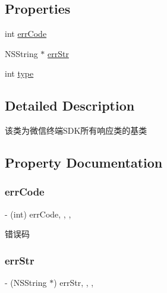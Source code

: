 \subsection*{Properties}
\begin{DoxyCompactItemize}
\item 
int \mbox{\hyperlink{interface_base_resp_ab21bc865cec3fc92ce2f911dc60ede04}{err\+Code}}
\item 
N\+S\+String $\ast$ \mbox{\hyperlink{interface_base_resp_a7d3f994261a01b950055083c56c52dec}{err\+Str}}
\item 
int \mbox{\hyperlink{interface_base_resp_a88d1e8d553c28f2e1e2078521a6dbefb}{type}}
\end{DoxyCompactItemize}


\subsection{Detailed Description}
该类为微信终端\+S\+D\+K所有响应类的基类 



\subsection{Property Documentation}
\mbox{\label{interface_base_resp_ab21bc865cec3fc92ce2f911dc60ede04}} 
\subsubsection{\texorpdfstring{err\+Code}{errCode}}
{\footnotesize\ttfamily -\/ (int) err\+Code\hspace{0.3cm}{\ttfamily [read]}, {\ttfamily [write]}, {\ttfamily [nonatomic]}, {\ttfamily [assign]}}

错误码 \mbox{\label{interface_base_resp_a7d3f994261a01b950055083c56c52dec}} 
\subsubsection{\texorpdfstring{err\+Str}{errStr}}
{\footnotesize\ttfamily -\/ (N\+S\+String $\ast$) err\+Str\hspace{0.3cm}{\ttfamily [read]}, {\ttfamily [write]}, {\ttfamily [nonatomic]}, {\ttfamily [retain]}}

